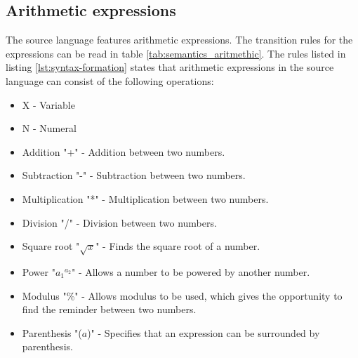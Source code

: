\subsection{Arithmetic expressions}
The source language features arithmetic expressions. The transition rules for the expressions can be read in table \ref{tab:semantics_aritmethic}.
The rules listed in listing \ref{lst:syntax-formation} states that arithmetic expressions in the source language can consist of the following operations:
\begin{itemize}
	\item X - Variable
	\item N - Numeral
	\item Addition "+" - Addition between two numbers.
	\item Subtraction "-" - Subtraction between two numbers.
	\item Multiplication "*" - Multiplication between two numbers.
	\item Division "/" - Division between two numbers.
	\item Square root "$\sqrt{x}$" - Finds the square root of a number.
	\item Power "${a_1}^{a_2}$" - Allows a number to be powered by another number.
	\item Modulus "\%" - Allows modulus to be used, which gives the opportunity to find the reminder between two numbers.
	\item Parenthesis "($a$)" - Specifies that an expression can be surrounded by parenthesis.
\end{itemize}

